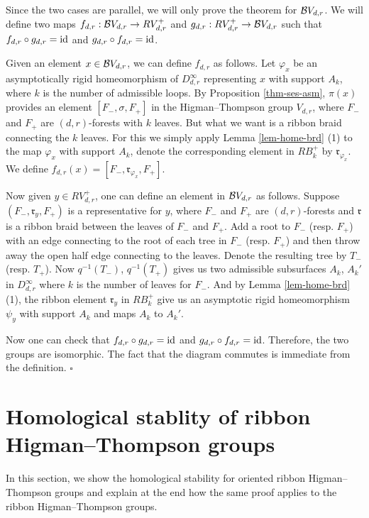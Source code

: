 \documentclass[11pt, a4paper]{amsart}
\theoremstyle{definition}
\newcommand{\id}{{{\rm id}}}
\def\Proof{\noindent{\bf Proof.}\quad}
\def\qed{\hfill$\square$\smallskip}
\begin{document}
\Proof
Since the two cases are parallel, we will only prove the theorem for ${\mathcal {B}} V_{d,r}$.  We will define two maps $f_{d,r}:{\mathcal {B}} V_{d,r} \rightarrow RV^+_{d,r} $ and $g_{d,r}:RV^+_{d,r} \to {\mathcal {B}} V_{d,r}$ such that $f_{d,r} \circ g_{d,r} =\id$ and $g_{d,r}\circ f_{d,r} = \id$. 


Given an element $x \in {\mathcal {B}} V_{d,r}$, we can define $f_{d,r}$ as follows. Let $\varphi_x$ be an asymptotically rigid homeomorphism of $D_{d,r}^{\infty}$ representing $x$ with support $A_k$, where $k$ is the number of admissible loops.  By Proposition \ref{thm-ses-asm}, $\pi(x)$ provides an element $[F_-,\sigma,F_+]$ in the Higman--Thompson group $V_{d,r}$, where $F_-$ and $F_+$ are $(d,r)$-forests with $k$ leaves.  But what we want is a ribbon braid connecting the $k$ leaves. For this we simply apply Lemma \ref{lem-home-brd} (1) to the map $\varphi_x$ with support $A_k$, denote the corresponding element in $RB^+_k$ by $\mathfrak{r}_{\varphi_x}$. We define $f_{d,r}(x) = [F_-,\mathfrak{r}_{\varphi_x},F_+]$.

Now given $y\in RV^+_{d,r}$, one can define an element in $ {\mathcal {B}} V_{d,r}$ as follows. Suppose $(F_-,\mathfrak{r}_y, F_+)$ is a representative for $y$, where $F_-$ and $F_+$ are $(d,r)$-forests  and $\mathfrak{r}$ is a ribbon braid between the leaves of $F_-$ and $F_+$. Add a root to $F_-$ (resp. $F_+$) with an edge connecting to the root of each tree in $F_-$ (resp. $F_+$) and then throw away the open half edge connecting to the leaves. Denote the resulting tree by $T_-$ (resp. $T_+$).  Now $q^{-1}(T_-)$, $q^{-1}(T_+)$ gives us two admissible subsurfaces $A_k$, $A_k'$ in $D^{\infty}_{d,r}$  where $k$ is the number of leaves for $F_-$.  And by Lemma \ref{lem-home-brd} (1), the ribbon element $\mathfrak{r}_y$ in $RB^+_k$ give us an asymptotic rigid  homeomorphism $\psi_y$ with support $A_k$ and maps $A_k$ to $A_k'$. 

Now one can check that $f_{d,r} \circ g_{d,r} =\id$ and $g_{d,r}\circ f_{d,r} = \id$. Therefore, the two groups are isomorphic. The fact that the diagram commutes is immediate from the definition.
\qed





\section{Homological stablity of ribbon Higman--Thompson groups}\label{sec:homstab}
In this section, we show the homological stability for oriented ribbon Higman--Thompson groups and explain at the end how the same proof applies to the ribbon Higman--Thompson groups. 
\end{document}

